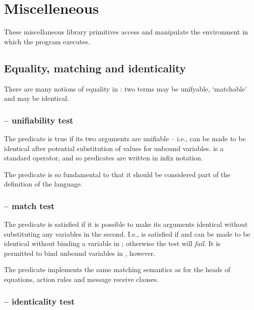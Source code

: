 \chapter{Miscelleneous}
\label{misc}

These miscellaneous library primitives access and manipulate the environment in which the \go program executes.

\section{Equality, matching and identicality}
\label{misc:equality}

There are many notions of equality in \go: two terms may be unifyable, `matchable' and may be identical.

\subsection{\function{=} -- unifiability test}
\label{misc:unifiable}

\synopsis{=}{[t,t]\{\}}

The \q{=} predicate is true if its two arguments are unifiable -- i.e., can be made to be identical after potential substitution of values for unbound variables. \q{=} is a standard operator, and so \q{=} predicates are written in infix notation.

The \q{=} predicate is so fundamental to \go that it should be considered part of the definition of the language.

\subsection{ -- match test}
\label{misc:match}


The  predicate is satisfied if it is possible to make its arguments identical without substituting any variables in the second. I.e.,  is satisfied if  and  can be made to be identical without binding a variable in ; otherwise the  test will \emph{fail}.  It is permitted to bind unbound variables in , however.

The  predicate implements the same matching semantics as for the heads of equations, action rules and message receive clauses.

\subsection{\function{==} -- identicality test}
\label{misc:identical}

